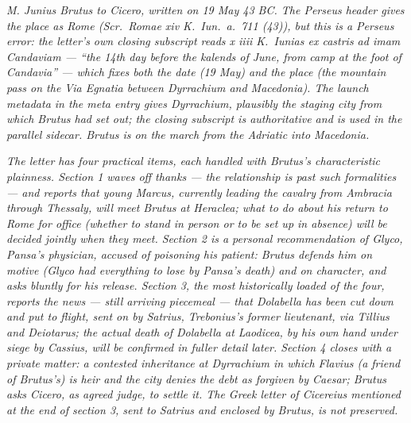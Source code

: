 
\textit{M. Junius Brutus to Cicero, written on 19 May 43
BC. The Perseus header gives the place as Rome (\textit{Scr.\
Romae xiv K.\ Iun.\ a.\ 711 (43)}), but this is a Perseus
error: the letter's own closing subscript reads
\textit{x iiii K.\ Iunias ex castris ad imam Candaviam}
--- ``the 14th day before the kalends of June, from camp
at the foot of Candavia'' --- which fixes both the date
(19 May) and the place (the mountain pass on the Via
Egnatia between Dyrrachium and Macedonia). The launch
metadata in the meta entry gives Dyrrachium, plausibly
the staging city from which Brutus had set out; the
closing subscript is authoritative and is used in the
parallel sidecar. Brutus is on the march from the
Adriatic into Macedonia.}

\textit{The letter has four practical items, each handled
with Brutus's characteristic plainness. Section 1 waves
off thanks --- the relationship is past such formalities
--- and reports that young Marcus, currently leading the
cavalry from Ambracia through Thessaly, will meet Brutus
at Heraclea; what to do about his return to Rome for
office (whether to stand in person or to be set up in
absence) will be decided jointly when they meet. Section
2 is a personal recommendation of Glyco, Pansa's
physician, accused of poisoning his patient: Brutus
defends him on motive (Glyco had everything to lose by
Pansa's death) and on character, and asks bluntly for
his release. Section 3, the most historically loaded of
the four, reports the news --- still arriving piecemeal
--- that Dolabella has been cut down and put to flight,
sent on by Satrius, Trebonius's former lieutenant, via
Tillius and Deiotarus; the actual death of Dolabella at
Laodicea, by his own hand under siege by Cassius, will
be confirmed in fuller detail later. Section 4 closes
with a private matter: a contested inheritance at
Dyrrachium in which Flavius (a friend of Brutus's) is
heir and the city denies the debt as forgiven by
Caesar; Brutus asks Cicero, as agreed judge, to settle
it. The Greek letter of Cicereius mentioned at the end
of section 3, sent to Satrius and enclosed by Brutus,
is not preserved.}
